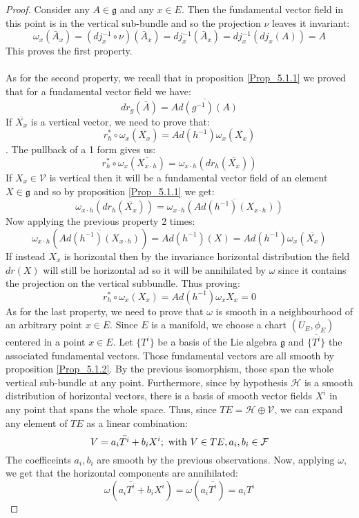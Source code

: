 \documentclass[12pt,a4paper]{report}
\theoremstyle{definition}
\theoremstyle{Theorem}
\theoremstyle{definition}
\theoremstyle{definition}
\begin{document}
	\begin{proof}
		Consider any $A\in\mathfrak{g}$ and any $x\in E$. Then the fundamental vector field in this point is in the vertical sub-bundle and so the projection $\nu$ leaves it invariant:
		$$\omega_{x}(\bar{A}_{x})=(dj_{x}^{-1}\circ \nu)(\bar{A}_{x})=dj_{x}^{-1}(\bar{A}_{x})=
		dj_{x}^{-1}(dj_{x}(A))=A$$
		This proves the first property.\\
		\\
		As for the second property, we recall that in proposition \ref{Prop_5.1.1} we proved that for a fundamental vector field  we have:
		$$dr_g(\bar{A})=\overline{Ad(g^{-1})(A)}$$
		If $\overline{X_x}$ is a vertical vector, we need to prove that:
		$$r^*_h\circ \omega_{x}(\overline{X_{x}})=Ad(h^{-1})\omega_{x}(\overline{X_{x}})$$. 
		The pullback of a 1 form gives us:
		$$r^*_h\circ \omega_{x}(\overline{X_{x\cdot h}})=\omega_{x\cdot h}(dr_h(\overline{X_{x}}))$$
		If $X_{x}\in\mathcal{V}$ is vertical then it will be a fundamental vector field of an element $X\in\mathfrak{g}$ and so by proposition \ref{Prop_5.1.1} we get:
		$$\omega_{x\cdot h}(dr_h(\overline{X_{x}}))=\omega_{x\cdot h}\overline{(Ad(h^{-1})(X_{x\cdot h}))}$$
		Now applying the previous property 2 times:
		$$\omega_{x\cdot h}(\overline{Ad(h^{-1})(X_{x\cdot h})})=Ad(h^{-1})(X)=Ad(h^{-1})\omega_{x}(\overline{X_{x}})$$
		If instead $X_{x}$ is horizontal then by the invariance horizontal distribution the field $dr(X)$ will still be horizontal ad so it will be annihilated by $\omega$ since it contains the projection on the vertical subbundle. Thus proving:
		$$r^*_h\circ \omega_{x}(X_{x})=Ad(h^{-1})\omega_{x}X_{x}=0$$
		As for the last property, we need to prove that $\omega$ is smooth in a neighbourhood of an arbitrary point $x\in E$. Since $E$ is a manifold, we choose a chart $(U_E,\phi_E)$ centered in a point $x\in E$. Let $\{T^i\}$ be a basis of the Lie algebra $\mathfrak{g}$ and $\{\bar{T^i}\}$ the associated fundamental vectors. Those fundamental vectors are all smooth by proposition \ref{Prop_5.1.2}. By the previous isomorphism, those span the whole vertical sub-bundle at any point. Furthermore, since by hypothesis $\mathcal{H}$ is a smooth distribution  of horizontal vectors, there is a basis of smooth vector fields $X^i$ in any point that spans the whole space. Thus, since $TE=\mathcal{H}\oplus\mathcal{V}$, we can expand any element of $TE$ as a linear combination:
		$$V=a_i \bar{T^i}+b_iX^i;\hbox{ with } V\in TE, a_i,b_i\in \mathcal{F}$$
		The coefficeints $a_i,b_i$ are smooth by the previous observations. Now, applying $\omega$, we get that the horizontal components are annihilated:
		$$\omega(a_i \bar{T^i}+b_iX^i)=\omega(a_i \bar{T^i})=a_i T^i$$
	\end{proof}
\end{document}
